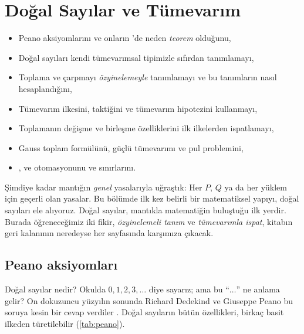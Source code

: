 \chapter{Doğal Sayılar ve Tümevarım}\label{bol:tumevarim}

\begin{bolumhedefleri}
\begin{itemize}
  \item Peano aksiyomlarını ve onların \Lean{}'de neden \emph{teorem}
        olduğunu,
  \item Doğal sayıları kendi tümevarımsal tipimizle sıfırdan tanımlamayı,
  \item Toplama ve çarpmayı \emph{özyinelemeyle} tanımlamayı ve bu
        tanımların nasıl hesaplandığını,
  \item Tümevarım ilkesini,  taktiğini ve tümevarım
        hipotezini kullanmayı,
  \item Toplamanın değişme ve birleşme özelliklerini ilk ilkelerden
        ispatlamayı,
  \item Gauss toplam formülünü, güçlü tümevarımı ve pul problemini,
  \item {},  ve  otomasyonunu
        ve sınırlarını.
\end{itemize}
\end{bolumhedefleri}

Şimdiye kadar mantığın \emph{genel} yasalarıyla uğraştık: Her $P$, $Q$
ya da her yüklem için geçerli olan yasalar. Bu bölümde ilk kez belirli bir
matematiksel yapıyı, doğal sayıları ele alıyoruz. Doğal sayılar, mantıkla
matematiğin buluştuğu ilk yerdir. Burada öğreneceğimiz iki fikir,
\emph{özyinelemeli tanım} ve \emph{tümevarımla ispat}, kitabın geri
kalanının neredeyse her sayfasında karşımıza çıkacak.

\section{Peano aksiyomları}\label{sec:peano}

Doğal sayılar nedir? Okulda $0, 1, 2, 3, \ldots$ diye sayarız; ama bu
``$\ldots$'' ne anlama gelir? On dokuzuncu yüzyılın sonunda Richard
Dedekind ve Giuseppe Peano bu soruya kesin bir cevap verdiler
\citep{dedekind1888, peano1889}. Doğal sayıların bütün özellikleri,
birkaç basit ilkeden türetilebilir (\cref{tab:peano}).

